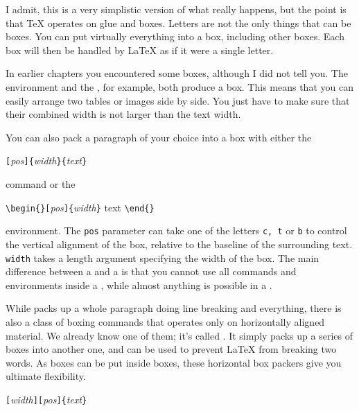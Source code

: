 I admit, this is a very simplistic version of what really happens, but the
point is that \TeX{} operates on glue and boxes. Letters are not the only
things that can be boxes. You can put virtually everything into a box,
including other boxes. Each box will then be handled by \LaTeX{} as if it
were a single letter.

In earlier chapters you encountered some boxes, although I did
not tell you. The  environment and the , for
example, both produce a box. This means that you can easily arrange two
tables or images side by side. You just have to make sure that their
combined width is not larger than the text width.

You can also pack a paragraph of your choice into a box with either
the

\begin{lscommand}
  \verb|[|\emph{pos}\verb|]{|\emph{width}\verb|}{|\emph{text}\verb|}|
\end{lscommand}

\noindent command or the

\begin{lscommand}
  \verb|\begin{|\verb|}[|\emph{pos}\verb|]{|\emph{width}\verb|}| text
  \verb|\end{|\verb|}|
\end{lscommand}

\noindent environment. The \texttt{pos} parameter can take one of the letters
\texttt{c, t} or \texttt{b} to control the vertical alignment of the box,
relative to the baseline of the surrounding text. \texttt{width} takes
a length argument specifying the width of the box. The main difference
between a  and a  is that you cannot use all commands
and environments inside a , while almost anything is possible in
a .

While  packs up a whole paragraph doing line breaking and
everything, there is also a class of boxing commands that operates
only on horizontally aligned material. We already know one of them;
it's called . It simply packs up a series of boxes into
another one, and can be used to prevent \LaTeX{} from breaking two
words. As boxes can be put inside boxes, these horizontal box packers
give you ultimate flexibility.

\begin{lscommand}
  \verb|[|\emph{width}\verb|][|\emph{pos}\verb|]{|\emph{text}\verb|}|
\end{lscommand}

